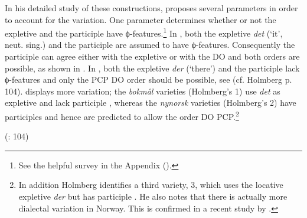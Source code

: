 \documentclass[output=paper]{LSP/langsci}
\begin{document}
\noindent In his detailed study of these constructions, \citet{Holmberg2002Expletives} proposes several parameters in order to account for the variation. One parameter determines whether or not the expletive and the participle have ϕ-features.\footnote{See the helpful survey in the Appendix (\citealt[125f]{Holmberg2002Expletives}).
} In , both the expletive \textit{det} (‘it’, neut. sing.) and the participle are assumed to have ϕ-features. Consequently the participle can agree either with the expletive or with the DO and both orders are possible, as shown in . In , both the expletive \textit{der} (‘there’) and the participle lack ϕ-features and only the PCP DO order should be possible, see  (cf. Holmberg p. 104).  displays more variation; the \textit{bokmål} varieties (Holmberg’s  1) use \textit{det} as expletive and lack participle  , whereas the \textit{nynorsk} varieties (Holmberg’s  2) have  participles  and hence are predicted to allow the order DO PCP.\footnote{In addition Holmberg identifies a third variety,  3, which uses the locative expletive \textit{der} but has participle . He also notes that there is actually more dialectal variation in Norway. This is confirmed in a recent study by \citet{AaEtAl2014}.}


\ea%
    \label{ex:engdahl:2}
     (\citealt{Holmberg2002Expletives}: 104)
\z
\z
\end{document}
